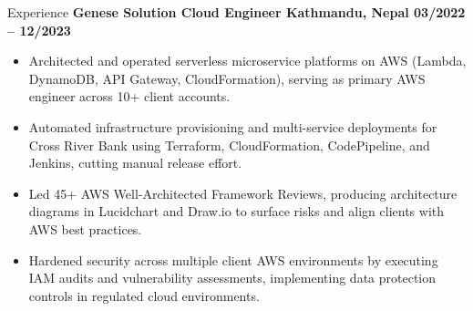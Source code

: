 \documentclass{resume}
\begin{document}
\begin{rSection}{Experience}
\textbf{Genese Solution \textbar{} Cloud Engineer \textbar{} Kathmandu, Nepal \hfill 03/2022 -- 12/2023}
\begin{itemize}
    \itemsep -3pt {}
    \item Architected and operated serverless microservice platforms on AWS (Lambda, DynamoDB, API Gateway, CloudFormation), serving as primary AWS engineer across 10+ client accounts.
    \item Automated infrastructure provisioning and multi-service deployments for Cross River Bank using Terraform, CloudFormation, CodePipeline, and Jenkins, cutting manual release effort.
    \item Led 45+ AWS Well-Architected Framework Reviews, producing architecture diagrams in Lucidchart and Draw.io to surface risks and align clients with AWS best practices.
    \item Hardened security across multiple client AWS environments by executing IAM audits and vulnerability assessments, implementing data protection controls in regulated cloud environments.
\end{itemize}

\end{rSection}

\end{document}
